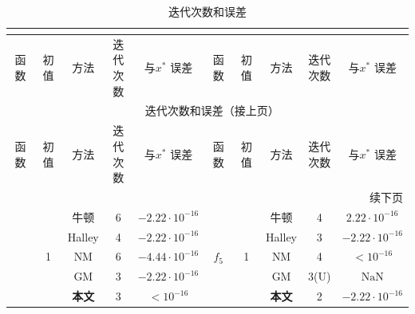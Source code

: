 \begin{center}
    \begin{longtable}[!htbp]{c|c|ccc|c|c|ccc}
    \caption{迭代次数和误差} \vspace*{-1em} 
    \label{tab:exp-result} \\
    
    \toprule 
    函数 & 初值 & 方法 & \makecell[c]{迭代\\次数} & \makecell[c]{与$x^*$\\误差} & 函数 & 初值 & 方法 & \makecell[c]{迭代\\次数} & \makecell[c]{与$x^*$\\误差} \\ 
    \midrule 
    \endfirsthead
    
    \multicolumn{10}{c}{{\tablename\ \thetable{} 迭代次数和误差（接上页）}} \\
    \toprule 
    函数 & 初值 & 方法 & \makecell[c]{迭代\\次数} & \makecell[c]{与$x^*$\\误差} & 函数 & 初值 & 方法 & \makecell[c]{迭代\\次数} & \makecell[c]{与$x^*$\\误差} \\ 
    \midrule 
    \endhead
    
    \bottomrule 
    \multicolumn{10}{r}{{续下页}} \\
    \endfoot
    
    \bottomrule
    \endlastfoot
    
        \multirow{10}{*}{$f_1$} & 	\multirow{5}{*}{1}  & 	牛顿  & 	6  & 	$-2.22 \cdot 10^{-16}$&	 \multirow{10}{*}{$f_5$}  & 	\multirow{5}{*}{1}  & 	牛顿  & 	4  & 	$2.22 \cdot 10^{-16}$\\

        & 	   & 	Halley  & 	4  & 	$-2.22 \cdot 10^{-16}$&	   & 	   & 	Halley  & 	3  & 	$-2.22 \cdot 10^{-16}$\\
     
        & 	   & 	NM  & 	6  & 	$-4.44 \cdot 10^{-16}$&	   & 	   & 	NM  & 	4  & 	$< 10^{-16}$\\
     
        & 	   & 	GM  & 	3  & 	$-2.22 \cdot 10^{-16}$&	   & 	   & 	GM  & 	3(U)  & 	$\text{NaN}$\\
     
        & 	   & 	\textbf{本文}  & 	3  & 	$< 10^{-16}$&	   & 	   & 	\textbf{本文}  & 	2  & 	$-2.22 \cdot 10^{-16}$\\
     

\end{longtable}
\end{center}
